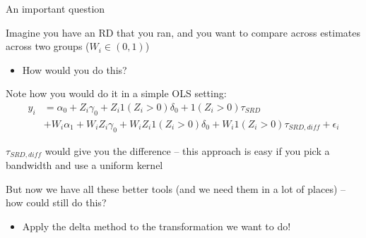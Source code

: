 \documentclass[notes,11pt, aspectratio=169]{beamer}
\newenvironment{wideitemize}{\itemize\addtolength{\itemsep}{10pt}}{\enditemize}
\begin{document}
\begin{frame}{An important question}
  \begin{wideitemize}
  \item Imagine you have an RD that you ran, and you want to compare
    across estimates across two groups ($W_{i} \in (0,1)$)
    \begin{itemize}
    \item How would you do this?
    \end{itemize}
  \item Note how you would do it in a simple OLS setting:
    \begin{align*}
      y_{i} &= \alpha_{0} +  Z_{i}\gamma_{0} + Z_{i}1(Z_{i} > 0)\delta_{0} + 1(Z_{i} > 0)\tau_{SRD} \\
            &+ W_{i}\alpha_{1} +  W_{i}Z_{i}\gamma_{0} + W_{i}Z_{i}1(Z_{i} > 0)\delta_{0} + W_{i}1(Z_{i} > 0)\tau_{SRD,diff} + \epsilon_{i}
    \end{align*}
              
    $\tau_{SRD,diff}$ would give you the difference -- this approach
    is easy if you pick a bandwidth and use a uniform kernel
  \item But now we have all these better tools (and we need them in a
    lot of places) -- how could still do this?
    \begin{itemize}
    \item  Apply the delta method to the transformation we want to do!
    \end{itemize}
    
  \end{wideitemize}
\end{frame}
\end{document}
